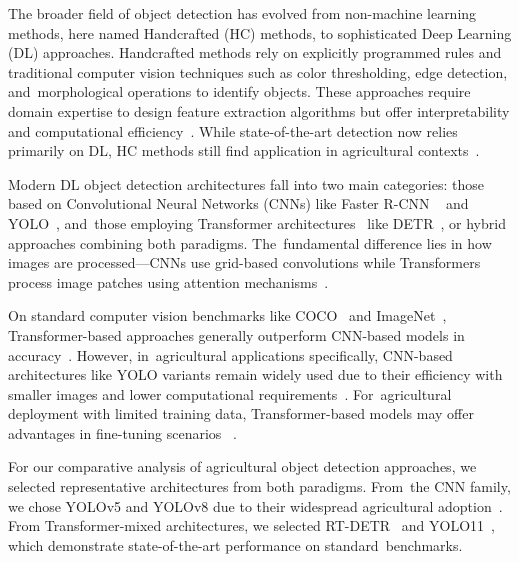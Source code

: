 \documentclass[12pt,a4paper,oneside]{report}
\begin{document}
The broader field of object detection has evolved from non-machine learning methods,
here named Handcrafted (HC) methods, 
to sophisticated Deep Learning (DL) approaches. Handcrafted methods rely on 
explicitly programmed rules and traditional computer vision techniques such as 
color thresholding, edge detection, and~morphological operations to identify 
objects. These approaches require domain expertise to design feature extraction 
algorithms but offer interpretability and computational efficiency~\cite{zhang2020cut,davidPlantDetectionCounting2021}. 
While state-of-the-art 
detection now relies primarily on DL, HC methods still find application in 
agricultural contexts~\cite{davidPlantDetectionCounting2021,garcia-martinezDigitalCountCorn2020}.

Modern DL object detection architectures fall into two main categories: those based
on Convolutional Neural Networks (CNNs) \cite{lecunDeepLearning2015} like Faster R-CNN
~\cite{FasterRCNNRealTime} and YOLO~\cite{YouOnlyLook}, and~those employing Transformer
architectures~\cite{vaswaniAttentionAllYou2017} like DETR~\cite{carionEndtoEndObjectDetection2020}, or hybrid approaches combining both paradigms. The~fundamental difference lies in how
images are processed—CNNs use grid-based convolutions while Transformers process
image patches using attention mechanisms~\cite{dosovitskiyImageWorth16x162021}.

On standard computer vision benchmarks like COCO~\cite{linMicrosoftCOCOCommon2015} 
and ImageNet~\cite{14090575ImageNetLarge}, Transformer-based approaches generally
outperform CNN-based models in accuracy~\cite{zongDETRsCollaborativeHybrid2023}. 
However, in~agricultural applications specifically, CNN-based architectures like YOLO
variants remain widely used due to their efficiency with smaller images and lower
computational requirements~\cite{khanSurveyVisionTransformers2023, 
badgujarAgriculturalObjectDetection2024}. For~agricultural deployment with limited
training data, Transformer-based models may offer advantages in fine-tuning scenarios
~\cite{rekavandiTransformersSmallObject2023,liTransformerObjectDetection2023}.

For our comparative analysis of agricultural object detection approaches, we selected
representative architectures from both paradigms. From~the CNN family, we chose YOLOv5
and YOLOv8 due to their widespread agricultural adoption~\cite{badgujarAgriculturalObjectDetection2024}.
From Transformer-mixed architectures, we selected RT-DETR~\cite{zhaoDETRsBeatYOLOs2024}
and YOLO11~\cite{khanamYOLOv11OverviewKey2024}, which demonstrate state-of-the-art
performance on standard~benchmarks.
\end{document}
